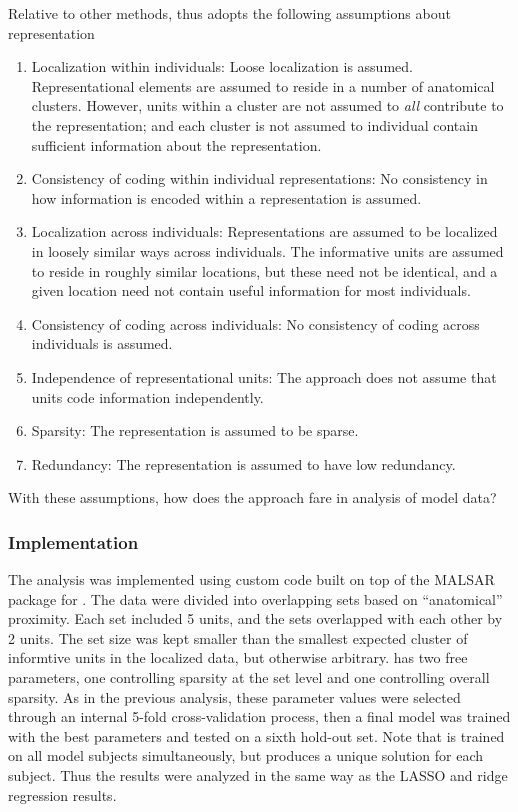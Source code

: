 Relative to other methods, \soslasso thus adopts the following assumptions about representation
\begin{enumerate}
\item Localization within individuals: Loose localization is assumed. Representational elements are assumed to reside in a number of anatomical clusters. However, units within a cluster are not assumed to {\em all} contribute to the representation; and each cluster is not assumed to individual contain sufficient information about the representation.

\item Consistency of coding within individual representations: No consistency in how information is encoded within a representation is assumed.

\item Localization across individuals: Representations are assumed to be localized in loosely similar ways across individuals. The informative units are assumed to reside in roughly similar locations, but these need not be identical, and a given location need not contain useful information for most individuals.

\item Consistency of coding across individuals: No consistency of coding across individuals is assumed.

\item Independence of representational units: The approach does not assume that units code information independently.

\item Sparsity: The representation is assumed to be sparse.

\item Redundancy: The representation is assumed to have low redundancy.
\end{enumerate}

With these assumptions, how does the approach fare in analysis of model data?

\subsubsection{Implementation} 
The \soslasso analysis was implemented using custom code built on top of the MALSAR package\cite{malsar} for \matlab. The data were divided into overlapping sets based on ``anatomical'' proximity. Each set included 5 units, and the sets overlapped with each other by 2 units. The set size was kept smaller than the smallest expected cluster of informtive units in the localized data, but otherwise arbitrary. \soslasso has two free parameters, one controlling sparsity at the set level and one controlling overall sparsity. As in the previous analysis, these parameter values  were selected through an internal 5-fold cross-validation process, then a final model was trained with the best parameters and tested on a sixth hold-out set. Note that \soslasso is trained on all model subjects simultaneously, but produces a unique solution for each subject. Thus the results were analyzed in the same way as the LASSO and ridge regression results.

